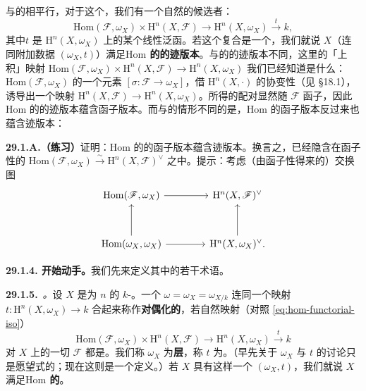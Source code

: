 与\trVectorBundle{}的\trSerreDuality{}相平行，对于这个\trPerfectPairing，我们有一个自然的候选者：
\begin{equation*}\tag{29.1.3.2}\label{eq:hom-trace-pairing}
\boxed{\mathrm{Hom}(\mathscr{F},\omega_X)\times\mathrm{H}^n(X,\mathscr{F})\longrightarrow\mathrm{H}^n(X,\omega_X)\overset{t}{\longrightarrow}k,}
\end{equation*}
其中\trTraceMap $t$ 是 $\mathrm{H}^n(X,\omega_X)$ 上的某个线性泛函。若这个复合是一个\trPerfectPairing，我们就说 $X$（连同附加数据 $(\omega_X,t)$）满足\textbf{$\mathrm{Hom}$ 的\trSerreDuality{}的迹版本}。与\trVectorBundle{}的\trSerreDuality{}的迹版本不同，这里的「上积」映射 $\mathrm{Hom}(\mathscr{F},\omega_X)\times\mathrm{H}^n(X,\mathscr{F})\to\mathrm{H}^n(X,\omega_X)$ 我们已经知道是什么：$\mathrm{Hom}(\mathscr{F},\omega_X)$ 的一个元素 $[\sigma\colon\mathscr{F}\to\omega_X]$，借 $\mathrm{H}^n(X,\cdot)$ 的协变性（见 \S18.1），诱导出一个映射 $\mathrm{H}^n(X,\mathscr{F})\to\mathrm{H}^n(X,\omega_X)$。所得的配对显然随 $\mathscr{F}$ 函子，因此 $\mathrm{Hom}$ 的\trSerreDuality{}的迹版本蕴含函子版本。而与\trVectorBundle{}的情形不同的是，$\mathrm{Hom}$ 的函子版本\trSerreDuality{}反过来也蕴含迹版本：

\textbf{29.1.A.（练习）}\quad 证明：$\mathrm{Hom}$ 的\trSerreDuality{}的函子版本蕴含迹版本。换言之，\trTraceMap{}已经隐含在函子性的\trIsomorphism{} $\mathrm{Hom}(\mathscr{F},\omega_X)\overset{\sim}{\longrightarrow}\mathrm{H}^n(X,\mathscr{F})^{\vee}$ 之中。提示：考虑（由函子性得来的）交换图
\[
\begin{tikzcd}[row sep=3.2em, column sep=4em]
\mathrm{Hom}(\mathscr{F},\omega_X) \ar[r] & \mathrm{H}^n(X,\mathscr{F})^{\vee} \\
\mathrm{Hom}(\omega_X,\omega_X) \ar[u] \ar[r] & \mathrm{H}^n(X,\omega_X)^{\vee}. \ar[u]
\end{tikzcd}
\]

\textbf{29.1.4. 开始动手。}\quad 我们先来定义其中的若干术语。

\textbf{29.1.5.}\ \emph{\trhDefinition{}。}\quad 设 $X$ 是\trDimension{}为 $n$ 的\trProjective{} $k$-\trScheme。一个\trCoherentSheaf{} $\omega=\omega_X=\omega_{X/k}$ 连同一个映射 $t\colon\mathrm{H}^n(X,\omega_X)\to k$ 合起来称作\textbf{对偶化的}，若自然映射（对照 \eqref{eq:hom-functorial-iso}）
\begin{equation*}\tag{29.1.5.1}\label{eq:dualizing-pairing}
\mathrm{Hom}(\mathscr{F},\omega_X)\times\mathrm{H}^n(X,\mathscr{F})\longrightarrow\mathrm{H}^n(X,\omega_X)\overset{t}{\longrightarrow}k
\end{equation*}
对 $X$ 上的一切\trCoherentSheaf{} $\mathscr{F}$ 都是\trPerfectPairing。我们称 $\omega_X$ 为\textbf{\trCanonical{}层}，称 $t$ 为\textbf{\trTraceMap}。（早先关于 $\omega_X$ 与 $t$ 的讨论只是愿望式的；现在这则是一个定义。）若 $X$ 具有这样一个 $(\omega_X,t)$，我们就说 $X$ 满足\textbf{$\mathrm{Hom}$ 的\trSerreDuality}。

